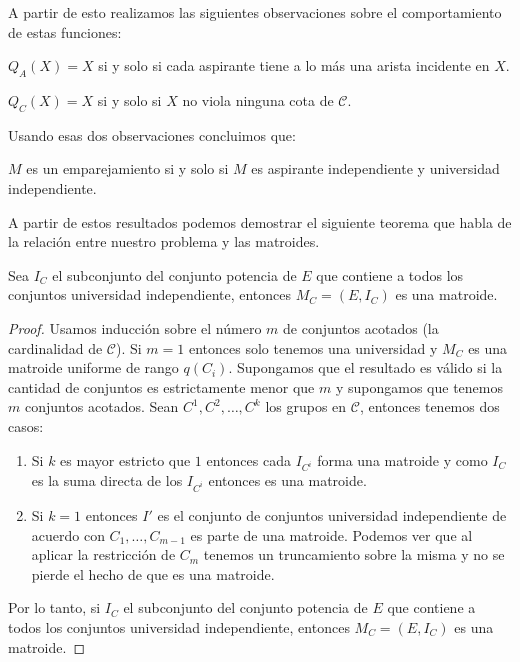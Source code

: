 A partir de esto realizamos las siguientes observaciones sobre el comportamiento de estas funciones:

\begin{obs}
$Q_A(X)=X$ si y solo si cada aspirante tiene a lo más una arista incidente en $X$.
\end{obs}
\begin{obs}
$Q_C(X)=X$ si y solo si $X$ no viola ninguna cota de $\mathcal{C}$.
\end{obs}

Usando esas dos observaciones concluimos que:

\begin{obs}
$M$ es un emparejamiento si y solo si $M$ es aspirante independiente y universidad independiente. 
\end{obs}

A partir de estos resultados podemos demostrar el siguiente teorema que habla de la relación entre nuestro problema y las matroides. 

\begin{teo}
\label{matroid}
Sea $I_C$ el subconjunto del conjunto potencia de $E$ que contiene a todos los conjuntos universidad independiente, entonces $M_C = (E,I_C)$ es una matroide. 
\end{teo}

\begin{proof}
Usamos inducción sobre el número $m$ de conjuntos acotados (la cardinalidad de $\mathcal{C}$). Si $m=1$ entonces solo tenemos una universidad y $M_C$ es una matroide uniforme de rango $q(C_i)$. 
Supongamos que el resultado es válido si la cantidad de conjuntos es estrictamente menor que $m$ y supongamos que tenemos $m$ conjuntos acotados. Sean $C^1,C^2,\dots, C^k$ los grupos en $\mathcal{C}$, entonces tenemos dos casos:
\begin{enumerate}
\item Si $k$ es mayor estricto que $1$ entonces cada $I_{C^i}$ forma una matroide y como $I_C$ es la suma directa de los $I_{C^i}$ entonces es una matroide. 
\item Si $k=1$ entonces $I'$ es el conjunto de conjuntos universidad independiente de acuerdo con $C_1,\dots,C_{m-1}$ es parte de una matroide. Podemos ver que al aplicar la restricción de $C_m$ tenemos un truncamiento sobre la misma y no se pierde el hecho de que es una matroide. 
\end{enumerate}
Por lo tanto, si $I_C$ el subconjunto del conjunto potencia de $E$ que contiene a todos los conjuntos universidad independiente, entonces $M_C = (E,I_C)$ es una matroide.
\end{proof}

